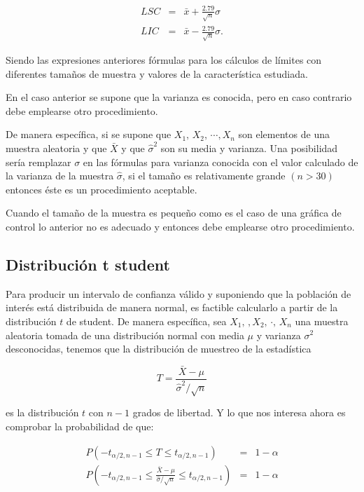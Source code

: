 \documentclass[english]{report}
\begin{document}
\begin{eqnarray*}
LSC & = & \bar{x}+\frac{2.79}{\sqrt{n}}\sigma\\
LIC & = & \bar{x}-\frac{2.79}{\sqrt{n}}\sigma.
\end{eqnarray*}


Siendo las expresiones anteriores fórmulas para los cálculos de límites
con diferentes tamaños de muestra y valores de la característica estudiada.

En el caso anterior se supone que la varianza es conocida, pero en caso contrario debe emplearse otro procedimiento.

De manera específica, si se supone que $X_1,\,X_2,\,\cdots,X_n$ son elementos de una muestra aleatoria y que $\bar{X}$ y que $\hat{\sigma}^2$ son su media
y varianza. Una posibilidad sería remplazar $\sigma$ en las fórmulas para varianza conocida con el valor calculado de la varianza de la muestra $\hat{\sigma}$, si el tamaño es relativamente grande $(n > 30)$ entonces éste es un procedimiento aceptable. 

Cuando el tamaño de la muestra es pequeño como es el caso de una gráfica de control lo anterior no es adecuado y entonces debe emplearse otro procedimiento.

\subsection{Distribución t student}

Para producir un intervalo de confianza válido y suponiendo que la población de interés está distribuida de manera normal, es factible calcularlo a partir de la distribución $t$ de student. De manera específica, sea $X_1,\,,X_2,\,\cdot,\,X_n$ una muestra aleatoria tomada de una distribución normal con media $\mu$ y varianza $\sigma^2$ desconocidas, tenemos que la distribución de muestreo de la estadística 

\begin{equation}
T=\frac{\bar{X}-\mu}{\hat{\sigma}^2/\sqrt{n}} 
\label{c2eq8}
\end{equation}

es la distribución $t$ con $n-1$ grados de libertad. Y lo que nos interesa ahora es comprobar la probabilidad de que:

\begin{eqnarray*}
P(-t_{\alpha/2,n-1} \leq T \leq t_{\alpha/2,n-1}) &=&1-\alpha\\
P(-t_{\alpha/2,n-1} \leq \frac{\bar{X}-\mu}{\hat{\sigma}/\sqrt{n}} \leq t_{\alpha/2,n-1}) &=&1-\alpha\\
\end{eqnarray*}
\end{document}
